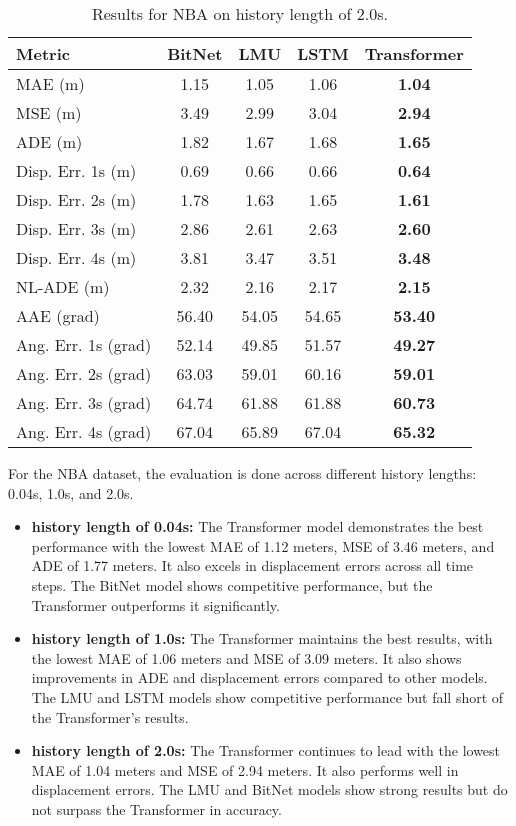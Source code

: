 \begin{table}[H]
\centering
\caption{Results for NBA on history length of 2.0s.}
\label{hist:NBA_2.0s}
\begin{tabular}{l||c|c|c|c}
Metric & BitNet & LMU & LSTM & Transformer \\
\hline \hline
MAE (m) & 1.15 & 1.05 & 1.06 & \textbf{1.04} \\
MSE (m) & 3.49 & 2.99 & 3.04 & \textbf{2.94} \\
ADE (m) & 1.82 & 1.67 & 1.68 & \textbf{1.65} \\
Disp. Err. 1s (m) & 0.69 & 0.66 & 0.66 & \textbf{0.64} \\
Disp. Err. 2s (m) & 1.78 & 1.63 & 1.65 & \textbf{1.61} \\
Disp. Err. 3s (m) & 2.86 & 2.61 & 2.63 & \textbf{2.60} \\
Disp. Err. 4s (m) & 3.81 & 3.47 & 3.51 & \textbf{3.48} \\
NL-ADE (m) & 2.32 & 2.16 & 2.17 & \textbf{2.15} \\
AAE (grad) & 56.40 & 54.05 & 54.65 & \textbf{53.40} \\
Ang. Err. 1s (grad) & 52.14 & 49.85 & 51.57 & \textbf{49.27} \\
Ang. Err. 2s (grad) & 63.03 & 59.01 & 60.16 & \textbf{59.01} \\
Ang. Err. 3s (grad) & 64.74 & 61.88 & 61.88 & \textbf{60.73} \\
Ang. Err. 4s (grad) & 67.04 & 65.89 & 67.04 & \textbf{65.32} \\
\end{tabular}
\end{table}

For the NBA dataset, the evaluation is done across different history lengths: 0.04s, 1.0s, and 2.0s. 

\begin{itemize}
    \item \textbf{history length of 0.04s:} The Transformer model demonstrates the best performance with the lowest MAE of 1.12 meters, MSE of 3.46 meters, and ADE of 1.77 meters. It also excels in displacement errors across all time steps. The BitNet model shows competitive performance, but the Transformer outperforms it significantly.
    \item \textbf{history length of 1.0s:} The Transformer maintains the best results, with the lowest MAE of 1.06 meters and MSE of 3.09 meters. It also shows improvements in ADE and displacement errors compared to other models. The LMU and LSTM models show competitive performance but fall short of the Transformer’s results.
    \item \textbf{history length of 2.0s:} The Transformer continues to lead with the lowest MAE of 1.04 meters and MSE of 2.94 meters. It also performs well in displacement errors. The LMU and BitNet models show strong results but do not surpass the Transformer in accuracy.
\end{itemize}


